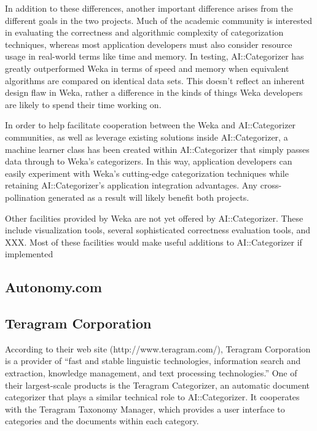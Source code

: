 In addition to these differences, another important difference arises
from the different goals in the two projects.  Much of the academic
community is interested in evaluating the correctness and algorithmic
complexity of categorization techniques, whereas most application
developers must also consider resource usage in real-world terms like
time and memory.  In testing, AI::Categorizer has greatly outperformed
Weka in terms of speed and memory when equivalent algorithms are
compared on identical data sets.  This doesn't reflect an inherent
design flaw in Weka, rather a difference in the kinds of things Weka
developers are likely to spend their time working on.

In order to help facilitate cooperation between the Weka and
AI::Categorizer communities, as well as leverage existing solutions
inside AI::Categorizer, a machine learner class has been created
within AI::Categorizer that simply passes data through to Weka's
categorizers.  In this way, application developers can easily
experiment with Weka's cutting-edge categorization techniques while
retaining AI::Categorizer's application integration advantages.  Any
cross-pollination generated as a result will likely benefit both
projects.

Other facilities provided by Weka are not yet offered by
AI::Categorizer.  These include visualization tools, several
sophisticated correctness evaluation tools, and XXX.  Most of these
facilities would make useful additions to AI::Categorizer if
implemented

\subsection{Autonomy.com}

\subsection{Teragram Corporation}

According to their web site (http://www.teragram.com/), Teragram
Corporation is a provider of ``fast and stable linguistic
technologies, information search and extraction, knowledge management,
and text processing technologies.''  One of their largest-scale
products is the Teragram Categorizer, an automatic document
categorizer that plays a similar technical role to AI::Categorizer.
It cooperates with the Teragram Taxonomy Manager, which provides a
user interface to categories and the documents within each category.

